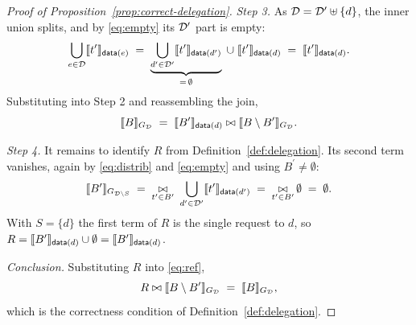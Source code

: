 \begin{proof}[Proof of Proposition~\ref{prop:correct-delegation}]
\emph{Step 3.} As $\mathcal{D} = \mathcal{D}^{\prime} \uplus \{d\}$, the inner union splits, and by
\eqref{eq:empty} its $\mathcal{D}^{\prime}$ part is empty:
\[
  \bigcup_{e \in \mathcal{D}} \llbracket t^{\prime} \rrbracket_{\mathsf{data}(e)}
  \;=\; \underbrace{\bigcup_{d^{\prime} \in \mathcal{D}^{\prime}}
        \llbracket t^{\prime} \rrbracket_{\mathsf{data}(d^{\prime})}}_{=\,\emptyset}
        \;\cup\; \llbracket t^{\prime} \rrbracket_{\mathsf{data}(d)}
  \;=\; \llbracket t^{\prime} \rrbracket_{\mathsf{data}(d)} .
\]
Substituting into Step 2 and reassembling the join,
\begin{equation}
  \llbracket B \rrbracket_{G_{\mathcal{D}}} \;=\;
  \llbracket B^{\prime} \rrbracket_{\mathsf{data}(d)} \bowtie \llbracket B \setminus B^{\prime} \rrbracket_{G_{\mathcal{D}}} .
  \label{eq:ref}
\end{equation}

\emph{Step 4.} It remains to identify $R$ from Definition~\ref{def:delegation}. Its
second term vanishes, again by \eqref{eq:distrib} and \eqref{eq:empty} and using
$B^{\prime} \neq \emptyset$:
\[
  \llbracket B^{\prime} \rrbracket_{G_{\mathcal{D} \setminus S}}
  \;=\; \mathop{\bowtie}\limits_{t^{\prime} \in B^{\prime}} \ \bigcup_{d^{\prime} \in \mathcal{D}^{\prime}}
        \llbracket t^{\prime} \rrbracket_{\mathsf{data}(d^{\prime})}
  \;=\; \mathop{\bowtie}\limits_{t^{\prime} \in B^{\prime}} \emptyset
  \;=\; \emptyset .
\]
With $S = \{d\}$ the first term of $R$ is the single request to $d$, so
$R = \llbracket B^{\prime} \rrbracket_{\mathsf{data}(d)} \cup \emptyset = \llbracket B^{\prime} \rrbracket_{\mathsf{data}(d)}$.

\emph{Conclusion.} Substituting $R$ into \eqref{eq:ref},
\[
  R \bowtie \llbracket B \setminus B^{\prime} \rrbracket_{G_{\mathcal{D}}} \;=\; \llbracket B \rrbracket_{G_{\mathcal{D}}},
\]
which is the correctness condition of Definition~\ref{def:delegation}.
\end{proof}

